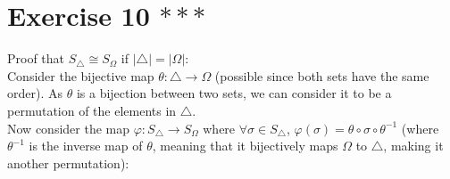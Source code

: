 \documentclass[12pt]{article}
\begin{document}
    \section*{Exercise 10 $***$}
    Proof that $S_\triangle \cong S_\Omega$
    if $|\triangle| = |\Omega|$: \\
    Consider the bijective map $\theta: \triangle \to \Omega$
    (possible since both sets have the same order).
    As $\theta$ is a bijection between two sets,
    we can consider it to be a permutation of the elements in $\triangle$. \\
    Now consider the map $\varphi: S_\triangle \to S_\Omega$
    where $\forall \sigma \in S_\triangle$,
    $\varphi(\sigma) = \theta \circ \sigma \circ \theta^{-1}$
    (where $\theta^{-1}$ is the inverse map of $\theta$,
    meaning that it bijectively maps $\Omega$ to $\triangle$,
    making it another permutation): \\
\end{document}
